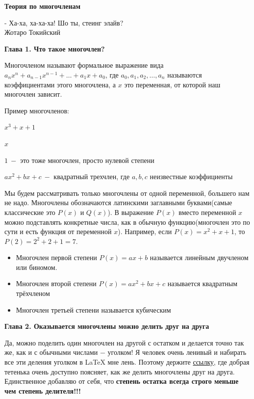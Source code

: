     \hspace{3mm}

\centerline{\bf \Huge Теория по многочленам}

\begin{flushright}
    \scriptsize{- Ха-ха, ха-ха-ха! Шо ты, стеинг элайв?\\Жотаро Токийский}
\end{flushright}


\textbf{\Large Глава 1. Что такое многочлен?}

Многочленом называют формальное выражение вида $a_nx^n + a_{n-1}x^{n-1}+\dotsc+a_1x+a_0$, где $a_0, a_1, a_2, \dotsc , a_n$ называются коэффициентами этого многочлена, а $x$ это переменная, от которой наш многочлен зависит.

Пример многочленов:

$x^3+x+1$

$x$

$1 \ - $ это тоже многочлен, просто нулевой степени

$ax^2 + bx + c \ -$ квадратный трехчлен, где $a, b, c$ неизвестные коэффициенты

Мы будем рассматривать только многочлены от одной переменной, большего нам не надо. Многочлены обозначаются латинскими заглавными буквами(самые классические это $P(x)$ и $Q(x)$). В выражение $P(x)$ вместо переменной $x$ можно подставлять конкретные числа, как в обычную функцию(многочлен это по сути и есть функция от переменной $x$). Например, если $P(x) = x^2+x+1$, то $P(2) = 2^2 + 2 + 1 = 7$.

\begin{itemize}
    \item Многочлен первой степени $P(x) = ax+b$ называется линейным двучленом или биномом.
    \item Многочлен второй степени $P(x) = ax^2 + bx+c$ называется квадратным трёхчленом
    \item Многочлен третьей степени называется кубическим
\end{itemize}

\textbf{\Large Глава 2. Оказывается многочлены можно делить друг на друга}

Да, можно поделить один многочлен на другой с остатком и делается точно так же, как и с обычными числами $-$ уголком! Я человек очень ленивый и набирать все эти деления уголком в LaTeX мне лень. Поэтому держите \href{https://www.youtube.com/watch?v=yhJ9xeo_W8c}{ссылку}, где добрая тетенька очень доступно поясняет, как же делить многочлены друг на друга. Единственное добавляю от себя, что \textbf{степень остатка всегда строго меньше чем степень делителя!!!}

